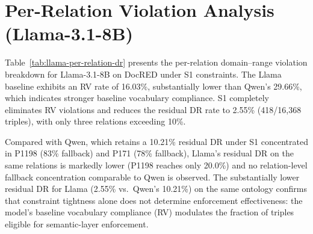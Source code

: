 
\section{Per-Relation Violation Analysis (Llama-3.1-8B)}\label{app:llama-per-relation}

Table~\ref{tab:llama-per-relation-dr} presents the per-relation domain--range violation breakdown for Llama-3.1-8B on DocRED under S1 constraints.
The Llama baseline exhibits an RV rate of 16.03\%, substantially lower than Qwen's 29.66\%, which indicates stronger baseline vocabulary compliance.
S1 completely eliminates RV violations and reduces the residual DR rate to 2.55\% (418/16{,}368 triples), with only three relations exceeding 10\%.

\begin{table}[h]
\centering
\caption{Top 10 per-relation DR violation rates for Llama-3.1-8B on DocRED under S1 constraints. Relations with $>$20 triples and 0\% DR (e.g., P131, P206, P361, P170, P86) are omitted.}
\label{tab:llama-per-relation-dr}
\end{table}

Compared with Qwen, which retains a 10.21\% residual DR under S1 concentrated in P1198 (83\% fallback) and P171 (78\% fallback), Llama's residual DR on the same relations is markedly lower (P1198 reaches only 20.0\%) and no relation-level fallback concentration comparable to Qwen is observed.
The substantially lower residual DR for Llama (2.55\% vs.\ Qwen's 10.21\%) on the same ontology confirms that constraint tightness alone does not determine enforcement effectiveness: the model's baseline vocabulary compliance (RV) modulates the fraction of triples eligible for semantic-layer enforcement.
